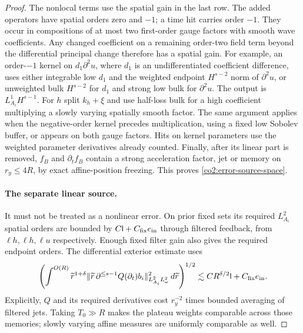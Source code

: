 \begin{proof}
The nonlocal terms use the spatial gain in the last row.  The added
operators have spatial orders zero and $-1$; a time hit carries order $-1$.
They occur in compositions of at most two first-order gauge factors with
smooth wave coefficients.  Any changed coefficient on a remaining order-two
field term beyond the differential principal change therefore has a spatial
gain.  For example, an order-$-1$ kernel on $d_1\partial^2u$, where $d_1$
is an undifferentiated coefficient difference, uses either integrable low
$d_1$ and the weighted endpoint $H^{s-2}$ norm of $\partial^2u$, or
unweighted bulk $H^{s-2}$ for $d_1$ and strong low bulk for
$\partial^2u$.  The output is $L^1_{A_i}H^{s-1}$.  For $h$ split
$k_h+\xi$ and use half-loss bulk for a high coefficient multiplying a
slowly varying spatially smooth factor.  The same argument applies when the
negative-order kernel precedes multiplication, using a fixed low Sobolev
buffer, or appears on both gauge factors.  Hits on kernel parameters use the
weighted parameter derivatives already counted.  Finally, after its linear
part is removed, $f_B$ and $\partial_t f_B$ contain a strong acceleration
factor, jet or memory on $r_y\le4R$, by exact affine-position freezing.
This proves \eqref{co2:error-source-space}.

\paragraph{The separate linear source.}
It must not be treated as a nonlinear error.  On prior fixed sets its
required $L^2_{A_i}$ spatial orders are bounded by
$C\mathsf l+C_{\rm fix}e_{\rm in}$ through filtered feedback, from
$\ell h,\ell h,\ell u$ respectively.  Enough fixed filter gain also gives
the required endpoint orders.  The differential exterior estimate uses
\begin{equation}\label{co2:outer-linear-source}
 \left(\int^{O(R)}\widetilde r^{1+\delta}
  \|\widetilde r\,\partial^{\le s-1}Q(\partial_t)b_i
       \|_{L^2_{A_i}L^2_\omega}^{2}\,d\widetilde r\right)^{1/2}
 \lesssim C R^{\delta/2}\mathsf l+C_{\rm fix}e_{\rm in}.
\end{equation}
Explicitly, $Q$ and its required derivatives cost
$r_y^{-2}$ times bounded averaging of filtered jets.  Taking $T_0\gg R$
makes the plateau weights comparable across those memories; slowly varying
affine measures are uniformly comparable as well.


\end{proof}
